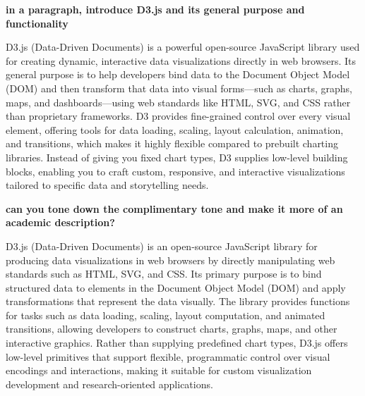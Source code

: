 \begin{singlespace}\small
		\textbf{\textsf{in a paragraph, introduce D3.js and its general purpose and functionality}}
\end{singlespace}

\begin{singlespace}\small
		\textsf{D3.js (Data-Driven Documents) is a powerful open-source JavaScript library used for creating dynamic, interactive data visualizations directly in web browsers. Its general purpose is to help developers bind data to the Document Object Model (DOM) and then transform that data into visual forms—such as charts, graphs, maps, and dashboards—using web standards like HTML, SVG, and CSS rather than proprietary frameworks. D3 provides fine-grained control over every visual element, offering tools for data loading, scaling, layout calculation, animation, and transitions, which makes it highly flexible compared to prebuilt charting libraries. Instead of giving you fixed chart types, D3 supplies low-level building blocks, enabling you to craft custom, responsive, and interactive visualizations tailored to specific data and storytelling needs.}
\end{singlespace}

\begin{singlespace}\small

	\textbf{\textsf{can you tone down the complimentary tone and make it more of an academic description?}}

\end{singlespace}

\begin{singlespace}\small
		\textsf{D3.js (Data-Driven Documents) is an open-source JavaScript library for producing data visualizations in web browsers by directly manipulating web standards such as HTML, SVG, and CSS. Its primary purpose is to bind structured data to elements in the Document Object Model (DOM) and apply transformations that represent the data visually. The library provides functions for tasks such as data loading, scaling, layout computation, and animated transitions, allowing developers to construct charts, graphs, maps, and other interactive graphics. Rather than supplying predefined chart types, D3.js offers low-level primitives that support flexible, programmatic control over visual encodings and interactions, making it suitable for custom visualization development and research-oriented applications.}
\end{singlespace}

